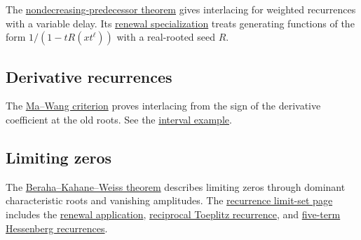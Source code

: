 The \hyperref[interlacingNondecreasingPredecessor]{nondecreasing-predecessor theorem}
gives interlacing for weighted recurrences with a variable delay.
Its \hyperref[interlacingRenewalRecurrences]{renewal specialization}
treats generating functions of the form $1/(1-tR(xt^\ell))$ with a
real-rooted seed $R$.

\subsection[derivativeRecurrenceRealRoots]{Derivative recurrences}

The \hyperref[maWangDerivativeCriterion]{Ma--Wang criterion} proves
interlacing from the sign of the derivative coefficient at the old roots.
See the \hyperref[interlacingDerivativeInterval]{interval example}.

\subsection[recurrenceLimitingZeros]{Limiting zeros}
\label{recurrenceBkwTheorem}
\label{toeplitzRecurrenceBkw}
\label{renewalLimitingZeros}

The \hyperref[toeplitzBkwTheorem]{Beraha--Kahane--Weiss theorem}
describes limiting zeros through dominant characteristic roots and vanishing
amplitudes. The \hyperref[toeplitzDeterminants]{recurrence limit-set page}
includes the \hyperref[recurrenceRenewalLimitSet]{renewal application},
\hyperref[toeplitzReciprocalRecurrence]{reciprocal Toeplitz recurrence},
and \hyperref[toeplitzHessenberg]{five-term Hessenberg recurrences}.
